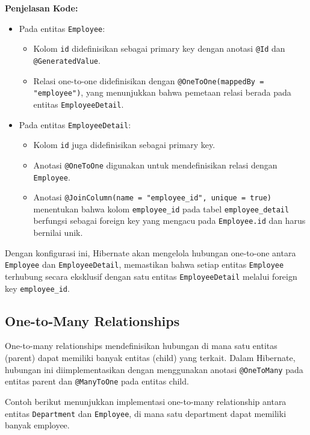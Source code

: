 \textbf{Penjelasan Kode:}
\begin{itemize}
	\item Pada entitas \texttt{Employee}:
	\begin{itemize}
		\item Kolom \texttt{id} didefinisikan sebagai primary key dengan anotasi \texttt{@Id} dan \texttt{@GeneratedValue}.
		\item Relasi one-to-one didefinisikan dengan \texttt{@OneToOne(mappedBy = "employee")}, yang menunjukkan bahwa pemetaan relasi berada pada entitas \texttt{EmployeeDetail}.
	\end{itemize}
	\item Pada entitas \texttt{EmployeeDetail}:
	\begin{itemize}
		\item Kolom \texttt{id} juga didefinisikan sebagai primary key.
		\item Anotasi \texttt{@OneToOne} digunakan untuk mendefinisikan relasi dengan \texttt{Employee}.
		\item Anotasi \texttt{@JoinColumn(name = "employee\_id", unique = true)} menentukan bahwa kolom \texttt{employee\_id} pada tabel \texttt{employee\_detail} berfungsi sebagai foreign key yang mengacu pada \texttt{Employee.id} dan harus bernilai unik.
	\end{itemize}
\end{itemize}

Dengan konfigurasi ini, Hibernate akan mengelola hubungan one-to-one antara \texttt{Employee} dan \texttt{EmployeeDetail}, memastikan bahwa setiap entitas \texttt{Employee} terhubung secara eksklusif dengan satu entitas \texttt{EmployeeDetail} melalui foreign key \texttt{employee\_id}.

\subsection{One-to-Many Relationships}

One-to-many relationships mendefinisikan hubungan di mana satu entitas (parent) dapat memiliki banyak entitas (child) yang terkait. Dalam Hibernate, hubungan ini diimplementasikan dengan menggunakan anotasi \texttt{@OneToMany} pada entitas parent dan \texttt{@ManyToOne} pada entitas child.

Contoh berikut menunjukkan implementasi one-to-many relationship antara entitas \texttt{Department} dan \texttt{Employee}, di mana satu department dapat memiliki banyak employee.

